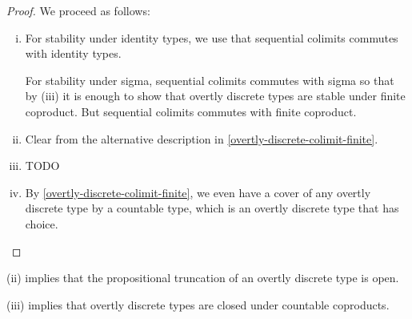 \begin{proof}
We proceed as follows:
\begin{enumerate}[(i)]
\item For stability under identity types, we use that sequential colimits commutes with identity types. 

For stability under sigma, sequential colimits commutes with sigma so that by (iii) it is enough to show that overtly discrete types are stable under finite coproduct. But sequential colimits commutes with finite coproduct.

\item Clear from the alternative description in \cref{overtly-discrete-colimit-finite}.

\item TODO

\item By \cref{overtly-discrete-colimit-finite}, we even have a cover of any overtly discrete type by a countable type, which is an overtly discrete type that has choice.
\end{enumerate}
\end{proof}

\begin{remark}
(ii) implies that the propositional truncation of an overtly discrete type is open.

(iii) implies that overtly discrete types are closed under countable coproducts.
\end{remark}